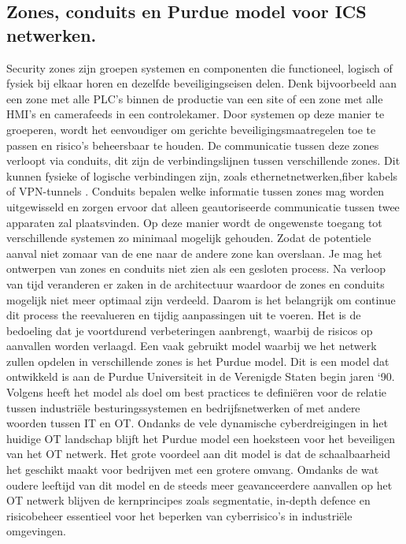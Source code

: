 \subsection{Zones, conduits en Purdue model voor ICS netwerken.}
Security zones zijn groepen systemen en componenten die functioneel, logisch of fysiek bij elkaar horen en dezelfde beveiligingseisen delen. Denk bijvoorbeeld aan een zone met alle PLC’s binnen de productie van een site of een zone met alle HMI’s en camerafeeds in een controlekamer. Door systemen op deze manier te groeperen, wordt het eenvoudiger om gerichte beveiligingsmaatregelen toe te passen en risico’s beheersbaar te houden. De communicatie tussen deze zones verloopt via conduits, dit zijn de verbindingslijnen tussen verschillende zones. Dit kunnen fysieke of logische verbindingen zijn, zoals ethernetnetwerken,fiber kabels of VPN-tunnels . Conduits bepalen welke informatie tussen zones mag worden uitgewisseld en zorgen ervoor dat alleen geautoriseerde communicatie tussen twee apparaten zal plaatsvinden. Op deze manier wordt de ongewenste toegang tot verschillende systemen zo minimaal mogelijk gehouden. Zodat de potentiele aanval niet zomaar van de ene naar de andere zone kan overslaan. \autocite{Dragos2023}
Je mag het ontwerpen van zones en conduits niet zien als een gesloten process. Na verloop van tijd veranderen er zaken in de architectuur waardoor de zones en conduits mogelijk niet meer optimaal zijn verdeeld. Daarom is het belangrijk om continue dit process the reevalueren en tijdig aanpassingen uit te voeren. Het is de bedoeling dat je voortdurend verbeteringen aanbrengt, waarbij de risicos op aanvallen worden verlaagd. \autocite{Incibe2018}
Een vaak gebruikt model waarbij we het netwerk zullen opdelen in verschillende zones is het Purdue model. Dit is een model dat ontwikkeld is aan de Purdue Universiteit in de Verenigde Staten begin jaren `90. Volgens \textcite{Mathezer2021}heeft het model als doel om best practices te definiëren voor de relatie tussen industriële besturingssystemen en bedrijfsnetwerken of met andere woorden tussen IT en OT. 
Ondanks de vele dynamische cyberdreigingen in het huidige OT landschap blijft het Purdue model een hoeksteen voor het beveiligen van het OT netwerk. Het grote voordeel aan dit model is dat de schaalbaarheid het geschikt maakt voor bedrijven met een grotere omvang. Omdanks de wat oudere leeftijd van dit model en de steeds meer geavanceerdere aanvallen op het OT netwerk blijven de kernprincipes zoals segmentatie, in-depth defence en risicobeheer essentieel voor het beperken van cyberrisico's in industriële omgevingen.

